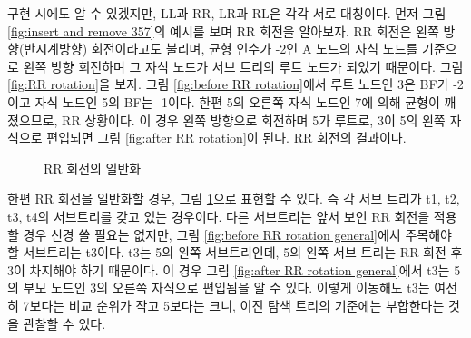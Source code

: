 \documentclass{article}
\begin{document}
구현 시에도 알 수 있겠지만, LL과 RR, LR과 RL은 각각 서로 대칭이다. 먼저 그림 \ref{fig:insert and remove 357}의 예시를 보며 RR 회전을 알아보자. RR 회전은 왼쪽 방향(반시계방향) 회전이라고도 불리며, 균형 인수가 -2인 A 노드의 자식 노드를 기준으로 왼쪽 방향 회전하며 그 자식 노드가 서브 트리의 루트 노드가 되었기 때문이다. 그림 \ref{fig:RR rotation}을 보자. 그림 \ref{fig:before RR rotation}에서 루트 노드인 3은 BF가 -2이고 자식 노드인 5의 BF는 -1이다. 한편 5의 오른쪽 자식 노드인 7에 의해 균형이 깨졌으므로, RR 상황이다. 이 경우 왼쪽 방향으로 회전하며 5가 루트로, 3이 5의 왼쪽 자식으로 편입되면 그림 \ref{fig:after RR rotation}이 된다. RR 회전의 결과이다.

\begin{figure}
    \centering
    \caption{RR 회전의 일반화}
    \label{fig:RR rotation general}
\end{figure}

한편 RR 회전을 일반화할 경우, 그림 \ref{fig:RR rotation general}으로 표현할 수 있다. 즉 각 서브 트리가 t1, t2, t3, t4의 서브트리를 갖고 있는 경우이다. 다른 서브트리는 앞서 보인 RR 회전을 적용할 경우 신경 쓸 필요는 없지만, 그림 \ref{fig:before RR rotation general}에서 주목해야 할 서브트리는 t3이다. t3는 5의 왼쪽 서브트리인데, 5의 왼쪽 서브 트리는 RR 회전 후 3이 차지해야 하기 때문이다. 이 경우 그림 \ref{fig:after RR rotation general}에서 t3는 5의 부모 노드인 3의 오른쪽 자식으로 편입됨을 알 수 있다. 이렇게 이동해도 t3는 여전히 7보다는 비교 순위가 작고 5보다는 크니, 이진 탐색 트리의 기준에는 부합한다는 것을 관찰할 수 있다.
\end{document}
